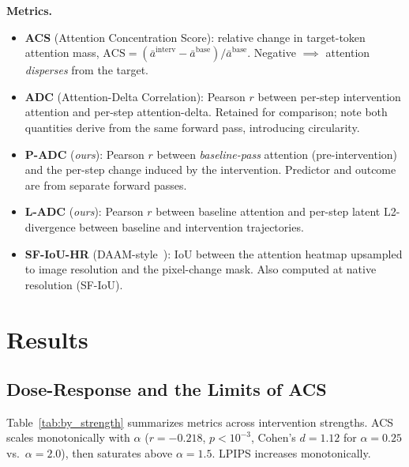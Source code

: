 \documentclass{article}
\newcommand{\metric}[1]{\textbf{#1}}
\begin{document}
\textbf{Metrics.}
\begin{itemize}[noitemsep,topsep=2pt,leftmargin=*]

\item \metric{ACS} (Attention Concentration Score): relative change
  in target-token attention mass,
  $\mathrm{ACS} = (\bar{a}^{\mathrm{interv}} - \bar{a}^{\mathrm{base}}) / \bar{a}^{\mathrm{base}}$.
  Negative $\implies$ attention \emph{disperses} from the target.

\item \metric{ADC} (Attention-Delta Correlation): Pearson $r$ between
  per-step intervention attention and per-step attention-delta.
  Retained for comparison; note both quantities derive from the same
  forward pass, introducing circularity.

\item \metric{P-ADC} (\emph{ours}): Pearson $r$ between
  \emph{baseline-pass} attention (pre-intervention) and the per-step
  change induced by the intervention. Predictor and outcome are
  from separate forward passes.

\item \metric{L-ADC} (\emph{ours}): Pearson $r$ between baseline
  attention and per-step latent L2-divergence between baseline and
  intervention trajectories.

\item \metric{SF-IoU-HR} (DAAM-style~\citep{tang2023daam}): IoU
  between the attention heatmap upsampled to image resolution and
  the pixel-change mask. Also computed at native resolution
  (SF-IoU).

\end{itemize}
\section{Results}
\label{sec:results}

\subsection{Dose-Response and the Limits of ACS}

Table~\ref{tab:by_strength} summarizes metrics across intervention
strengths.  ACS scales monotonically with $\alpha$ ($r=-0.218$,
$p < 10^{-3}$, Cohen's $d=1.12$ for $\alpha\!=\!0.25$
vs.\ $\alpha\!=\!2.0$), then saturates above $\alpha=1.5$.
LPIPS increases monotonically.
\end{document}

